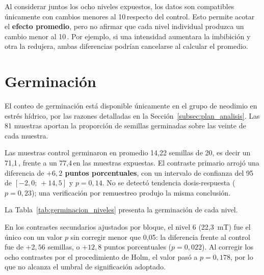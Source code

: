 \begin{alcancelimitacion}
\tituloalcance
Al considerar juntos los ocho niveles expuestos, los datos son compatibles únicamente con cambios menores al 10\,\pct respecto del control. Esto permite acotar el \textbf{efecto promedio}, pero no afirmar que cada nivel individual produzca un cambio menor al 10\,\pct. Por ejemplo, si una intensidad aumentara la imbibición y otra la redujera, ambas diferencias podrían cancelarse al calcular el promedio.
\end{alcancelimitacion}

\section{Germinación}
\label{sec:res_germinacion}

El conteo de germinación está disponible únicamente en el grupo de neodimio en estrés hídrico, por las razones detalladas en la Sección~\ref{subsec:plan_analisis}. Las 81 muestras aportan la proporción de semillas germinadas sobre las veinte de cada muestra.

Las muestras control germinaron en promedio 14,22 semillas de 20, es decir un 71,1\,\pct, frente a un 77,4\,\pct en las muestras expuestas. El contraste primario arrojó una diferencia de \textbf{\(+6{,}2\) puntos porcentuales}, con un intervalo de confianza del 95\,\pct de \([-2{,}0;\ +14{,}5]\) y \(p = 0{,}14\). No se detectó tendencia dosis-respuesta (\(p = 0{,}23\)); una verificación por remuestreo produjo la misma conclusión.

La Tabla~\ref{tab:germinacion_niveles} presenta la germinación de cada nivel.

En los contrastes secundarios ajustados por bloque, el nivel 6 (22{,}3~mT) fue el único con un valor \(p\) sin corregir menor que 0{,}05: la diferencia frente al control fue de \(+2{,}56\) semillas, o \(+12{,}8\) puntos porcentuales (\(p = 0{,}022\)). Al corregir los ocho contrastes por el procedimiento de Holm, el valor pasó a \(p = 0{,}178\), por lo que no alcanza el umbral de significación adoptado.

